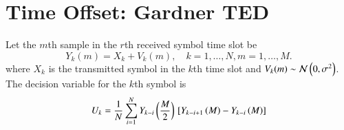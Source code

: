 \documentclass[journal,12pt,twocolumn]{IEEEtran}
\begin{document}
\section{Time Offset: Gardner TED}
%
Let the $m$th sample in the $r$th received symbol time slot be
\begin{equation}
Y_k(m)= X_k + V_k(m), \quad k = 1,\dots,N, m = 1 ,\dots,M.
\end{equation} 
where $X_k$ is the transmitted symbol in the $k$th time slot and $V_k(m) \sim \mathcal{N}\left(0,\sigma^2\right) $. 
The decision variable for the $k$th symbol 
is 
\cite{time_offset}
\begin{align}
U_k=\frac{1}{N}\sum^{N}_{i=1}Y_{k-i}\left(\frac{M}{2}\right){}\left[Y_{k-i+1}\left(M\right)-Y_{k-i}\left(M\right)\right]
\end{align}
%
\end{document}
